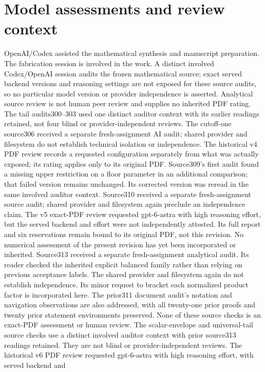 \documentclass[11pt]{article}
\begin{document}
\section*{Model assessments and review context}
OpenAI/Codex assisted the mathematical synthesis and manuscript preparation.
The fabrication session is involved in the work. A distinct involved
Codex/OpenAI session audits the frozen mathematical source; exact served
backend versions and reasoning settings are not exposed for these source
audits, so no particular
model version or provider independence is asserted. Analytical source
review is not human peer review and supplies no inherited PDF rating.
The tail audits300--303 used one distinct auditor context with its earlier
readings retained, not four blind or provider-independent reviews. The
cutoff-one source306 received a separate fresh-assignment AI audit;
shared provider and filesystem do not establish technical isolation or
independence. The
historical v4 PDF review records a requested configuration separately from
what was actually exposed; its rating applies only to its original PDF.
Source309's first audit found a missing upper restriction on a floor
parameter in an additional comparison; that failed version remains
unchanged. Its corrected version was reread in the same involved auditor
context. Source310 received a separate fresh-assignment source audit;
shared provider and filesystem again preclude an independence claim.
The v5 exact-PDF review requested gpt-6-astra with high reasoning effort,
but the served backend and effort were not independently attested.
Its full report and six reservations remain bound to its original PDF,
not this revision. No numerical assessment of the present revision
has yet been incorporated or inherited.
Source313 received a separate fresh-assignment analytical audit. Its
reader checked the inherited explicit balanced family rather than relying
on previous acceptance labels. The shared provider and filesystem again
do not establish independence. Its minor request to bracket each
normalized product factor is incorporated here. The prior311 document
audit's notation and navigation observations are also addressed, with all
twenty-one prior proofs and twenty prior statement environments preserved.
None of these source checks is an exact-PDF assessment or human review.
The scalar-envelope and universal-tail source checks use a distinct
involved auditor context with prior source313 readings retained. They are
not blind or provider-independent reviews. The historical v6 PDF review
requested gpt-6-astra with high reasoning effort, with served backend and
\end{document}
